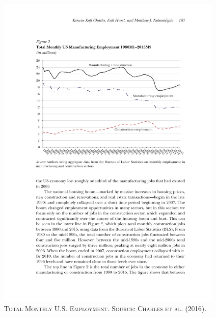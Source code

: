 \documentclass[]{book}
\begin{document}
\begin{figure}

{\centering \includegraphics[width=0.8\linewidth,height=0.8\textheight]{figures/CharlesHurstNotowidigdo2016/fig2} 

}

\caption{\textsc{Total Monthly U.S.
Employment. Source: Charles et al. (2016).}}\label{fig:CharlesHurstNotowidigdo2016-fig2}
\end{figure}
\end{document}
